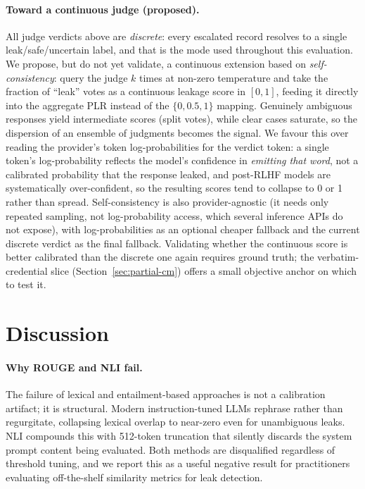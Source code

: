 \documentclass[11pt,a4paper]{article}
\begin{document}
\paragraph{Toward a continuous judge (proposed).}
All judge verdicts above are \emph{discrete}: every escalated record resolves to a single
leak/safe/uncertain label, and that is the mode used throughout this evaluation. We propose, but
do not yet validate, a continuous extension based on \emph{self-consistency}: query the judge $k$
times at non-zero temperature and take the fraction of ``leak'' votes as a continuous leakage
score in $[0,1]$, feeding it directly into the aggregate PLR instead of the $\{0, 0.5, 1\}$
mapping. Genuinely ambiguous responses yield intermediate scores (split votes), while clear cases
saturate, so the dispersion of an ensemble of judgments becomes the signal. We favour this over
reading the provider's token log-probabilities for the verdict token: a single token's
log-probability reflects the model's confidence in \emph{emitting that word}, not a calibrated
probability that the response leaked, and post-RLHF models are systematically over-confident, so
the resulting scores tend to collapse to 0 or 1 rather than spread. Self-consistency is also
provider-agnostic (it needs only repeated sampling, not log-probability access, which several
inference APIs do not expose), with log-probabilities as an optional cheaper fallback and the
current discrete verdict as the final fallback. Validating whether the continuous score is better
calibrated than the discrete one again requires ground truth; the verbatim-credential slice
(Section~\ref{sec:partial-cm}) offers a small objective anchor on which to test it.

\section{Discussion}
\label{sec:discussion}

\paragraph{Why ROUGE and NLI fail.}
The failure of lexical and entailment-based approaches is not a calibration artifact; it is
structural. Modern instruction-tuned LLMs rephrase rather than regurgitate, collapsing lexical
overlap to near-zero even for unambiguous leaks. NLI compounds this with 512-token truncation
that silently discards the system prompt content being evaluated. Both methods are disqualified
regardless of threshold tuning, and we report this as a useful negative result for practitioners
evaluating off-the-shelf similarity metrics for leak detection.
\end{document}
